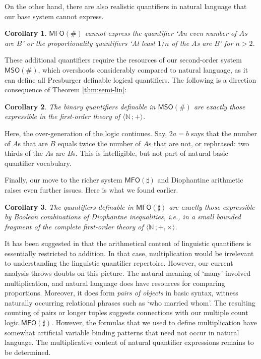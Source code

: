 \documentclass[12pt,oneside,reqno]{amsart}
\newtheorem{corollary}{Corollary}
\theoremstyle{definition}
\begin{document}
On the other hand, there are also realistic  quantifiers in natural language that our base system cannot express. 


\begin{corollary} $\mathsf{MFO(\#)}$ cannot express the quantifier \emph{`An even number of $A$s are $B$'} or the proportionality quantifiers \emph{`At least $1/n$ of the $A$s are $B$'} for $n>2$. \label{corollary:proportion}
\end{corollary} 

These additional quantifiers require the resources of our second-order system $\mathsf{MSO(\#)}$, which overshoots considerably compared to natural language, as it can define all Presburger definable logical quantifiers. The following is a direction consequence of Theorem \ref{thm:semi-lin}:
\begin{corollary} The binary quantifiers definable in $\mathsf{MSO(\#)}$ are exactly those expressible in the first-order theory of $\langle \mathbb{N}\,; + \rangle$.
\end{corollary} 

Here, the over-generation of the logic continues. Say, $2a = b$  says that  the number of $A$s that are $B$ equals twice the number of $A$s that are not, or rephrased: two thirds of the $A$s are $B$s. This is intelligible, but not part of natural basic quantifier vocabulary.


Finally, our move to the richer system $\mathsf{MFO}(\sharp)$ and Diophantine arithmetic raises even further issues. Here is what we found earlier.

\begin{corollary} The quantifiers definable in $\mathsf{MFO}(\sharp)$ are exactly those expressible by Boolean combinations of Diophantne inequalities, i.e., in a small bounded fragment  of the complete first-order theory of $\langle \mathbb{N}\,; +,\times \rangle$. 
\end{corollary} 


It has been suggested in \cite{vanBenthem1985} that the arithmetical content of linguistic quantifiers is essentially restricted to addition. In that case, multiplication would be irrelevant to understanding the linguistic quantifier repertoire. However, our current analysis throws doubts on this picture. The natural  meaning of `many' involved multiplication, and natural language does have resources for comparing proportions. Moreover, it does form \emph{pairs of objects} in basic syntax, witness naturally occurring relational phrases such as `who married whom'. The resulting counting of pairs or longer tuples suggests  connections with our multiple count logic $\mathsf{MFO}(\sharp)$. However, the formulas that we used to define multiplication have somewhat artificial variable binding patterns that need not occur in natural language. The multiplicative content of natural quantifier expressions remains to be determined.
\end{document}
